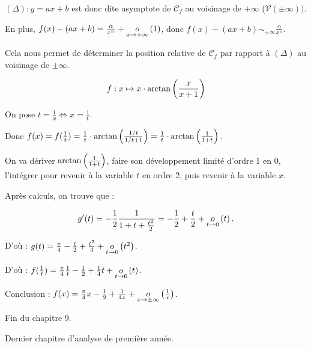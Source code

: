 \documentclass[12pt, a4paper]{report}
\begin{document}
$(\Delta):y=ax+b$ est donc dite asymptote de $\mathcal{C}_f$ au voisinage de $+\infty$ ($\mathcal{V}(\pm\infty))$.

En plus, $f(x)-(ax+b) = \frac{\alpha}{x^n} + \underset{x\to+\infty}{o}\left(1\right)$, donc $f(x) - (ax+b) \sim_{\pm\infty} \frac{\alpha}{x^n}$.

Cela nous permet de déterminer la position relative de $\mathcal{C}_f$ par rapport à $(\Delta)$ au voisinage de $\pm\infty$.

\begin{example}
    $$f:x\mapsto x\cdot\arctan\left(\frac{x}{x+1}\right)$$

    On pose $t = \frac1x \iff x = \frac1t$.

    Donc $f(x)= f(\frac1t) = \frac{1}{t} \cdot \arctan\left(\frac{1/t}{1/t + 1}\right) = \frac{1}{t} \cdot \arctan\left(\frac{1}{1+t}\right)$.

    On va dériver $\arctan\left(\frac{1}{1+t}\right)$, faire son développement limité d'ordre 1 en 0, l'intégrer pour revenir à la variable $t$ en ordre 2, puis revenir à la variable $x$.

    Après calculs, on trouve que :

    $$g'(t) = -\frac12 \frac{1}{1+t+\frac{t^2}2} = -\frac12 + \frac{t}{2} + \underset{t\to0}{o}\left(t\right).$$

    D'où : $g(t)=\frac\pi4 - \frac{t}{2} + \frac{t^2}{4} + \underset{t\to0}{o}\left(t^2\right)$.

    D'où : $f(\frac1t) = \frac\pi4 \frac1t - \frac12 + \frac14 t + \underset{t\to0}{o}\left(t\right)$.

    Conclusion : $f(x) = \frac\pi4 x - \frac12 + \frac{1}{4x} + \underset{x\to\pm\infty}{o}\left(\frac1x\right)$.
\end{example}

\begin{center}
    Fin du chapitre 9.

    Dernier chapitre d'analyse de première année.
\end{center}
\end{document}
